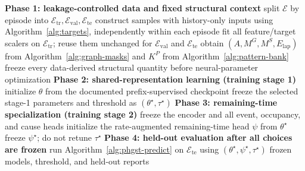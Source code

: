 \documentclass[a4paper,fleqn]{cas-dc}
\begin{document}
\begin{algorithm*}[t]
\SetAlFnt{\small}
\SetAlCapFnt{\small}
\SetAlCapNameFnt{\small\bfseries}
\SetInd{0.6em}{1.0em}
\caption{End-to-end PHGST-DM training, selection, and held-out evaluation.}
\label{alg:phgst-train}
\BlankLine
\textbf{Phase 1: leakage-controlled data and fixed structural context}\;
split $\mathcal{E}$ by episode into $\mathcal{E}_{\mathrm{tr}},\mathcal{E}_{\mathrm{val}},\mathcal{E}_{\mathrm{te}}$\;
construct samples with history-only inputs using Algorithm~\ref{alg:targets}, independently within each episode\;
fit all feature/target scalers on $\mathcal{E}_{\mathrm{tr}}$; reuse them unchanged for $\mathcal{E}_{\mathrm{val}}$ and $\mathcal{E}_{\mathrm{te}}$\;
obtain $(A,M^{G},M^{S},E_{\mathrm{lap}})$ from Algorithm~\ref{alg:graph-masks} and $K^{P}$ from Algorithm~\ref{alg:pattern-bank}\;
freeze every data-derived structural quantity before neural-parameter optimization 
\BlankLine
\textbf{Phase 2: shared-representation learning (training stage 1)}\;
initialize $\theta$ from the documented prefix-supervised checkpoint\;
freeze the selected stage-1 parameters and threshold as $(\theta^{\star},\tau^{\star})$ 
\BlankLine
\textbf{Phase 3: remaining-time specialization (training stage 2)}\;
freeze the encoder and all event, occupancy, and cause heads\;
initialize the rate-augmented remaining-time head $\psi$ from $\theta^{\star}$\;
freeze $\psi^{\star}$; do not retune $\tau^{\star}$\;
\BlankLine
\textbf{Phase 4: held-out evaluation after all choices are frozen}\;
run Algorithm~\ref{alg:phgst-predict} on $\mathcal{E}_{\mathrm{te}}$ using $(\theta^{\star},\psi^{\star},\tau^{\star})$\;
\Return frozen models, threshold, and held-out reports 
\end{algorithm*}
\end{document}
